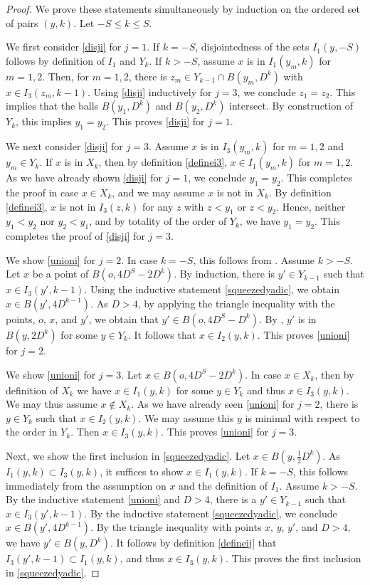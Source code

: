 \begin{proof}
We prove these statements simultaneously by induction on the ordered set of pairs $(y,k)$. Let $-S\le k\le S$.

We first consider \eqref{disji} for $j=1$. If $k=-S$, disjointedness of the sets $I_1(y,-S)$ follows by definition of $I_1$ and $Y_k$. If $k>-S$, assume $x$ is in $I_1(y_m,k)$ for $m=1,2$. Then, for $m=1,2$, there is $z_m\in Y_{k-1}\cap B(y_m,D^k)$ with $x\in I_3(z_m,k-1)$. Using \eqref{disji} inductively for $j=3$, we conclude $z_1=z_2$. This implies that the balls $B(y_1, D^k)$ and $B(y_2, D^k)$ intersect. By construction of $Y_k$, this implies $y_1=y_2$. This proves \eqref{disji} for $j=1$.

We next consider \eqref{disji} for $j=3$. Assume $x$ is in $I_3(y_m,k)$ for $m=1,2$ and $y_m\in Y_k$. If $x$ is in $X_k$, then by definition \eqref{definei3}, $x\in I_1(y_m,k)$ for $m=1,2$. As we have already shown \eqref{disji} for $j=1$, we conclude $y_1=y_2$. This completes the proof in case $x\in X_k$, and we may assume $x$ is not in $X_k$. By definition \eqref{definei3}, $x$ is not in $I_3(z,k)$ for any $z$ with $z<y_1$ or $z<y_2$. Hence, neither $y_1<y_2$ nor $y_2<y_1$, and by totality of the order of $Y_k$, we have $y_1=y_2$. This completes the proof of \eqref{disji} for $j=3$.

We show \eqref{unioni} for $j=2$. In case $k=-S$, this follows from . Assume $k>-S$. Let $x$ be a point of $B(o, 4D^S-2D^k)$. By induction, there is $y'\in Y_{k-1}$ such that $x\in I_3(y',k-1)$. Using the inductive statement \eqref{squeezedyadic}, we obtain $x\in B(y',4D^{k-1})$. As $D>4$, by applying the triangle inequality with the points, $o$, $x$, and $y'$, we obtain that $y'\in B(o, 4D^S-D^k)$. By , $y'$ is in $B(y,2D^k)$ for some $y\in Y_k$. It follows that $x\in I_2(y,k)$. This proves \eqref{unioni} for $j=2$.

We show \eqref{unioni} for $j=3$. Let $x\in B(o, 4D^S-2D^k)$. In case $x\in X_k$, then by definition of $X_k$ we have $x\in I_1(y,k)$ for some $y\in Y_k$ and thus $x\in I_3(y,k)$. We may thus assume $x\not\in X_k$. As we have already seen \eqref{unioni} for $j=2$, there is $y\in Y_k$ such that $x\in I_2(y,k)$. We may assume this $y$ is minimal with respect to the order in $Y_k$. Then $x\in I_3(y,k)$. This proves \eqref{unioni} for $j=3$.

Next, we show the first inclusion in \eqref{squeezedyadic}. Let $x\in B(y,\frac 12 D^k)$. As $I_1(y,k)\subset I_3(y,k)$, it suffices to show $x\in I_1(y,k)$. If $k=-S$, this follows immediately from the assumption on $x$ and the definition of $I_1$. Assume $k>-S$. By the inductive statement \eqref{unioni} and $D>4$, there is a $y'\in Y_{k-1}$ such that $x\in I_3(y',k-1)$. By the inductive statement \eqref{squeezedyadic}, we conclude $x\in B(y',4D^{k-1})$. By the triangle inequality with points $x$, $y$, $y'$, and $D>4$, we have $y'\in B(y,D^k)$. It follows by definition \eqref{defineij} that $I_3(y',k-1)\subset I_1(y,k)$, and thus $x\in I_3(y,k)$. This proves the first inclusion in \eqref{squeezedyadic}.


\end{proof}
